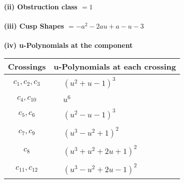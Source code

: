 \documentclass[1p]{elsarticle_modified}
\theoremstyle{definition}
\begin{document}
\flushleft \textbf{(ii) Obstruction class $= 1$}\\~\\
\flushleft \textbf{(iii) Cusp Shapes $= - a^2-2 a u+a- u-3$}\\~\\
\newpage\renewcommand{\arraystretch}{1}
\flushleft \textbf{(iv) u-Polynomials at the component}\newline \\
\begin{tabular}{m{50pt}|m{274pt}}
Crossings & \hspace{64pt}u-Polynomials at each crossing \\
\hline $$\begin{aligned}c_{1},c_{2},c_{3}\end{aligned}$$&$\begin{aligned}
&(u^2+u-1)^3
\end{aligned}$\\
\hline $$\begin{aligned}c_{4},c_{10}\end{aligned}$$&$\begin{aligned}
&u^6
\end{aligned}$\\
\hline $$\begin{aligned}c_{5},c_{6}\end{aligned}$$&$\begin{aligned}
&(u^2- u-1)^3
\end{aligned}$\\
\hline $$\begin{aligned}c_{7},c_{9}\end{aligned}$$&$\begin{aligned}
&(u^3- u^2+1)^2
\end{aligned}$\\
\hline $$\begin{aligned}c_{8}\end{aligned}$$&$\begin{aligned}
&(u^3+u^2+2 u+1)^2
\end{aligned}$\\
\hline $$\begin{aligned}c_{11},c_{12}\end{aligned}$$&$\begin{aligned}
&(u^3- u^2+2 u-1)^2
\end{aligned}$\\
\hline
\end{tabular}\\~\\
\end{document}
